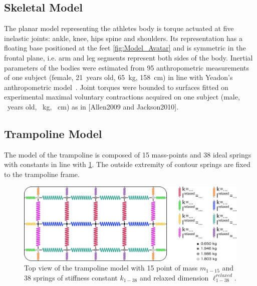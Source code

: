\subsection{Skeletal Model}\label{subsec:2a}
The planar model representing the athletes body is torque actuated at five inelastic joints: ankle, knee, hips spine and shoulders.
Its representation has a floating base positioned at the feet \ref{fig:Model_Avatar} and is symmetric in the frontal plane, i.e. arm and leg segments represent both sides of the body.
Inertial parameters of the bodies were estimated from 95 anthropometric measurements of one subject (female, 21~years old, 65~kg, 158~cm) in line with Yeadon's anthropometric model~\cite{yeadon1990simulation}.
Joint torques were bounded to surfaces fitted on experimental maximal voluntary contractions acquired on one subject (male, ~years old, ~kg, ~cm)  as in [Allen2009 and Jackson2010].


\subsection{Trampoline Model}\label{subsec:2b}
The model of the trampoline is composed of 15 mass-points and 38 ideal springs with constants in line with \cite{jacques2008determining} \ref{fig:Model_Toile}.
The outside extremity of contour springs are fixed to the trampoline frame.


\begin{figure}[h!]
\centering
\includegraphics[width=\linewidth]{figures/Model_Toile.png}
\caption{Top view of the trampoline model with 15 point of mass $m_{1-15}$ and 38 springs of stiffness constant $k_{1-38}$ and relaxed dimension ${\ell}^{relaxed}_{1-38}$.
}
\label{fig:Model_Toile}
\end{figure}


